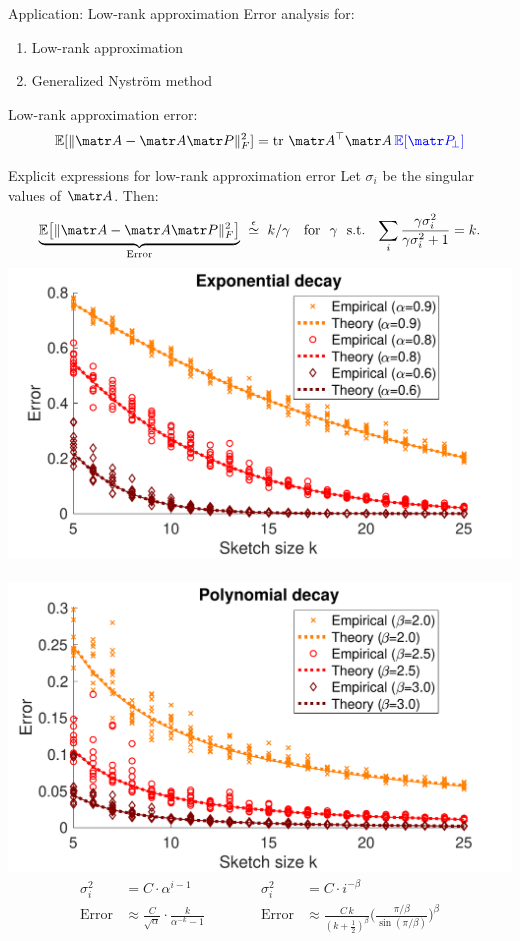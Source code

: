 \begin{frame}{Application: Low-rank approximation}
  Error analysis for:
   \begin{enumerate}
     \item Low-rank approximation \parencite{tropp2011structure}
     \item Generalized Nystr\"om method \parencite{revisiting-nystrom}
    \end{enumerate}
    
    \pause
    
    Low-rank approximation error:
    \begin{align*}
      \E[\|\A - \A\P\|_F^2]= \tr\,\A^\top\A\,\Blue{\E[\P_{\!\perp}]}
    \end{align*}
\end{frame}

\begin{frame}{Explicit expressions for low-rank approximation error}
  Let $\sigma_i$ be the singular values of $\A$. Then:
  \begin{align*}
    \underbrace{\E\big[\|\A-\A\P\|_F^2\big]}_{\text{Error}} \ \overset\epsilon\simeq\ 
    k/\gamma
\quad \text{for \ $\gamma$ \ s.t. \ } \sum_{i}\frac{\gamma\sigma_i^2}{\gamma\sigma_i^2+1} = k.
  \end{align*}
\includegraphics[width=.495\textwidth]{Figures/projections/explicit_exp}~%
\nolinebreak\includegraphics[width=.495\textwidth]{Figures/projections/explicit_poly}
      \begin{align*}
        \sigma_i^2&=C\cdot\alpha^{i-1}
&&&&&      \sigma_i^2
        &=C\cdot i^{-\beta}
        \\
        \text{Error} & \approx
\frac C{\sqrt\alpha}\cdot
  \frac{k}{\alpha^{-k}-1}
&&&&&  
\text{Error}&\approx
\frac{C\,k}{(k+\frac12)^\beta}\bigg(\frac{\pi/\beta}{\sin(\pi/\beta)}\bigg)^\beta
      \end{align*}
\end{frame}

